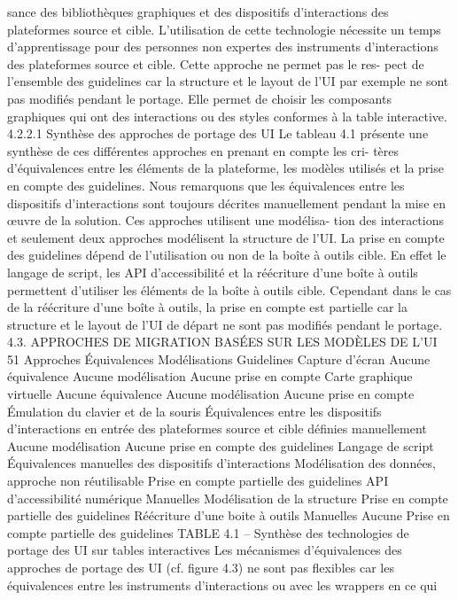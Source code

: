 \documentclass{article}
\begin{document}
sance des bibliothèques graphiques et des dispositifs d’interactions des plateformes source et cible.
L’utilisation de cette technologie nécessite un temps d’apprentissage pour des personnes non expertes
des instruments d’interactions des plateformes source et cible. Cette approche ne permet pas le res-
pect de l’ensemble des guidelines car la structure et le layout de l’UI par exemple ne sont pas modiﬁés
pendant le portage. Elle permet de choisir les composants graphiques qui ont des interactions ou des
styles conformes à la table interactive.
4.2.2.1
Synthèse des approches de portage des UI
Le tableau 4.1 présente une synthèse de ces différentes approches en prenant en compte les cri-
tères d’équivalences entre les éléments de la plateforme, les modèles utilisés et la prise en compte des
guidelines. Nous remarquons que les équivalences entre les dispositifs d’interactions sont toujours
décrites manuellement pendant la mise en œuvre de la solution. Ces approches utilisent une modélisa-
tion des interactions et seulement deux approches modélisent la structure de l’UI. La prise en compte
des guidelines dépend de l’utilisation ou non de la boîte à outils cible. En effet le langage de script, les
API d’accessibilité et la réécriture d’une boîte à outils permettent d’utiliser les éléments de la boîte à
outils cible. Cependant dans le cas de la réécriture d’une boîte à outils, la prise en compte est partielle
car la structure et le layout de l’UI de départ ne sont pas modiﬁés pendant le portage.
4.3. APPROCHES DE MIGRATION BASÉES SUR LES MODÈLES DE L’UI
51
Approches
Équivalences
Modélisations
Guidelines
Capture d’écran
Aucune équivalence
Aucune modélisation
Aucune prise en
compte
Carte graphique
virtuelle
Aucune équivalence
Aucune modélisation
Aucune prise en
compte
Émulation du clavier
et de la souris
Équivalences entre les
dispositifs
d’interactions en entrée
des plateformes source
et cible déﬁnies
manuellement
Aucune modélisation
Aucune prise en
compte des guidelines
Langage de script
Équivalences
manuelles des
dispositifs
d’interactions
Modélisation des
données, approche non
réutilisable
Prise en compte
partielle des guidelines
API d’accessibilité
numérique
Manuelles
Modélisation de la
structure
Prise en compte
partielle des guidelines
Réécriture d’une
boite à outils
Manuelles
Aucune
Prise en compte
partielle des guidelines
TABLE 4.1 – Synthèse des technologies de portage des UI sur tables interactives
Les mécanismes d’équivalences des approches de portage des UI (cf. ﬁgure 4.3) ne sont pas
ﬂexibles car les équivalences entre les instruments d’interactions ou avec les wrappers en ce qui
\end{document}
